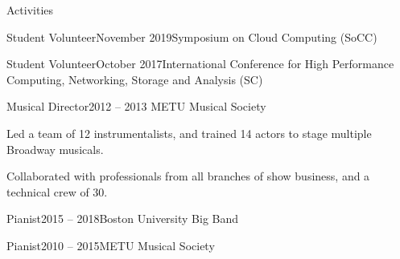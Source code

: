 \documentclass{resume}
\begin{document}
\begin{rSection}{Activities}
  \begin{rWorksectionNoList}{Student Volunteer}{November 2019}{Symposium on Cloud
      Computing (SoCC)}
  \end{rWorksectionNoList}

  \begin{rWorksectionNoList}{Student Volunteer}{October 2017}{International
      Conference for High Performance Computing, Networking, Storage and
      Analysis (SC)}
  \end{rWorksectionNoList}

  \begin{rWorksection}{Musical Director}{2012 -- 2013}{
      METU Musical Society}
  \item Led a team of 12 instrumentalists, and trained 14 actors to stage
    multiple Broadway musicals.
  \item Collaborated with professionals from all branches of show business, and
    a technical crew of 30.
  \end{rWorksection}

  \begin{rWorksectionNoList}{Pianist}{2015 -- 2018}{Boston University Big Band}
  \end{rWorksectionNoList}

  \begin{rWorksectionNoList}{Pianist}{2010 -- 2015}{METU Musical Society}
  \end{rWorksectionNoList}
\end{rSection}
\end{document}
